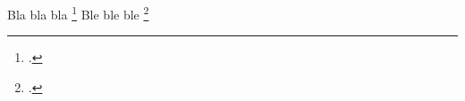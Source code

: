 \documentclass{beamer}
\begin{document}
    \begin{frame}
        Bla bla bla \footcite{greenwade93} Ble ble ble \footcite{goossens93}
    \end{frame}
\end{document}

